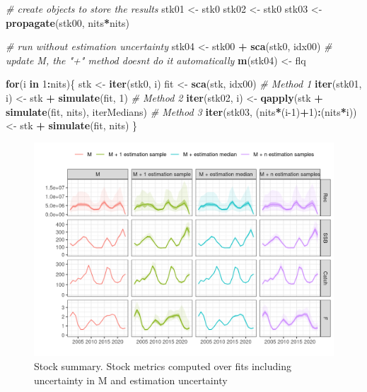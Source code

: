 \documentclass[
]{book}
\newenvironment{Shaded}{\begin{snugshade}}{\end{snugshade}}
\newcommand{\CommentTok}[1]{\textcolor[rgb]{0.56,0.35,0.01}{\textit{#1}}}
\newcommand{\ControlFlowTok}[1]{\textcolor[rgb]{0.13,0.29,0.53}{\textbf{#1}}}
\newcommand{\DecValTok}[1]{\textcolor[rgb]{0.00,0.00,0.81}{#1}}
\newcommand{\FunctionTok}[1]{\textcolor[rgb]{0.13,0.29,0.53}{\textbf{#1}}}
\newcommand{\NormalTok}[1]{#1}
\newcommand{\OtherTok}[1]{\textcolor[rgb]{0.56,0.35,0.01}{#1}}
\newcommand{\SpecialCharTok}[1]{\textcolor[rgb]{0.81,0.36,0.00}{\textbf{#1}}}
\begin{document}
\begin{Shaded}
\begin{Highlighting}[]
\CommentTok{\# create objects to store the results}
\NormalTok{stk01 }\OtherTok{\textless{}{-}}\NormalTok{ stk0}
\NormalTok{stk02 }\OtherTok{\textless{}{-}}\NormalTok{ stk0}
\NormalTok{stk03 }\OtherTok{\textless{}{-}} \FunctionTok{propagate}\NormalTok{(stk00, nits}\SpecialCharTok{*}\NormalTok{nits)}

\CommentTok{\# run without estimation uncertainty}
\NormalTok{stk04 }\OtherTok{\textless{}{-}}\NormalTok{ stk00 }\SpecialCharTok{+} \FunctionTok{sca}\NormalTok{(stk0, idx00)}
\CommentTok{\# update M, the "+" method doesn\textquotesingle{}t do it automatically}
\FunctionTok{m}\NormalTok{(stk04) }\OtherTok{\textless{}{-}}\NormalTok{ flq}

\ControlFlowTok{for}\NormalTok{(i }\ControlFlowTok{in} \DecValTok{1}\SpecialCharTok{:}\NormalTok{nits)\{}
\NormalTok{    stk }\OtherTok{\textless{}{-}} \FunctionTok{iter}\NormalTok{(stk0, i)}
\NormalTok{    fit }\OtherTok{\textless{}{-}} \FunctionTok{sca}\NormalTok{(stk, idx00)}
    \CommentTok{\# Method 1}
    \FunctionTok{iter}\NormalTok{(stk01, i) }\OtherTok{\textless{}{-}}\NormalTok{ stk }\SpecialCharTok{+} \FunctionTok{simulate}\NormalTok{(fit, }\DecValTok{1}\NormalTok{)}
    \CommentTok{\# Method 2}
    \FunctionTok{iter}\NormalTok{(stk02, i) }\OtherTok{\textless{}{-}} \FunctionTok{qapply}\NormalTok{(stk }\SpecialCharTok{+} \FunctionTok{simulate}\NormalTok{(fit, nits), iterMedians)}
    \CommentTok{\# Method 3}
    \FunctionTok{iter}\NormalTok{(stk03, (nits}\SpecialCharTok{*}\NormalTok{(i}\DecValTok{{-}1}\NormalTok{)}\SpecialCharTok{+}\DecValTok{1}\NormalTok{)}\SpecialCharTok{:}\NormalTok{(nits}\SpecialCharTok{*}\NormalTok{i)) }\OtherTok{\textless{}{-}}\NormalTok{ stk }\SpecialCharTok{+} \FunctionTok{simulate}\NormalTok{(fit, nits)}
\NormalTok{\}}
\end{Highlighting}
\end{Shaded}

\begin{figure}
\centering
\includegraphics{_bookdown_files/_main_files/figure-html/mprop-1.png}
\caption{\label{fig:mprop}Stock summary. Stock metrics computed over fits including uncertainty in M and estimation uncertainty}
\end{figure}
\end{document}
